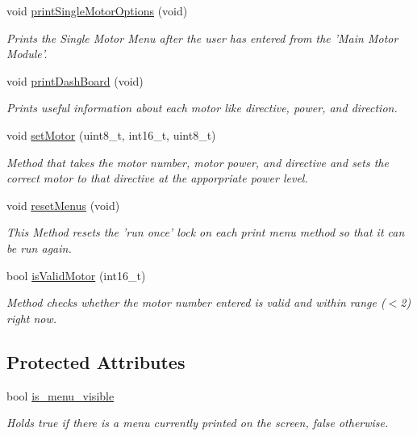 \begin{DoxyCompactItemize}
void \hyperlink{classtask__user_a2866e8641ba983d7b819348a25774d47}{print\-Single\-Motor\-Options} (void)
\begin{DoxyCompactList}\small\item\em Prints the Single Motor Menu after the user has entered from the 'Main Motor Module'. \end{DoxyCompactList}\item 
void \hyperlink{classtask__user_affce6abe0cc4a021f490711a15234915}{print\-Dash\-Board} (void)
\begin{DoxyCompactList}\small\item\em Prints useful information about each motor like directive, power, and direction. \end{DoxyCompactList}\item 
void \hyperlink{classtask__user_ae247fa7d8dd68902ff4abf2c77b00fe2}{set\-Motor} (uint8\-\_\-t, int16\-\_\-t, uint8\-\_\-t)
\begin{DoxyCompactList}\small\item\em Method that takes the motor number, motor power, and directive and sets the correct motor to that directive at the apporpriate power level. \end{DoxyCompactList}\item 
void \hyperlink{classtask__user_a3ba42fcb41ae5292b75fe427ff26932c}{reset\-Menus} (void)
\begin{DoxyCompactList}\small\item\em This Method resets the 'run once' lock on each print menu method so that it can be run again. \end{DoxyCompactList}\item 
bool \hyperlink{classtask__user_a6178fb80b0e6fdebf254cc9aee6235a5}{is\-Valid\-Motor} (int16\-\_\-t)
\begin{DoxyCompactList}\small\item\em Method checks whether the motor number entered is valid and within range ($<$2) right now. \end{DoxyCompactList}\end{DoxyCompactItemize}
\subsection*{Protected Attributes}
\begin{DoxyCompactItemize}
\item 
\hypertarget{classtask__user_aeed69ce02fadbfb4a64758535e5c958b}{bool \hyperlink{classtask__user_aeed69ce02fadbfb4a64758535e5c958b}{is\-\_\-menu\-\_\-visible}}\label{classtask__user_aeed69ce02fadbfb4a64758535e5c958b}

\begin{DoxyCompactList}\small\item\em Holds true if there is a menu currently printed on the screen, false otherwise. \end{DoxyCompactList}\end{DoxyCompactItemize}


